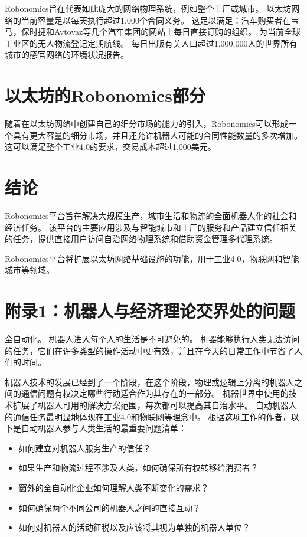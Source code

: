 \documentclass[UTF8]{article}
\begin{document}
Robonomics旨在代表如此庞大的网络物理系统，例如整个工厂或城市。 以太坊网络的当前容量足以每天执行超过1,000个合同义务。 这足以满足：汽车购买者在宝马，保时捷和Avtovaz等几个汽车集团的网站上每日直接订购的组织。 为当前全球工业区的无人物流登记定期航线。 每日出版有关人口超过1,000,000人的世界所有城市的感官网络的环境状况报告。

\section{以太坊的Robonomics部分}

随着在以太坊网络中创建自己的细分市场的能力的引入，Robonomics可以形成一个具有更大容量的细分市场，并且还允许机器人可能的合同性能数量的多次增加。 这可以满足整个工业4.0的要求，交易成本超过1,000美元。

\section{结论}

Robonomics平台旨在解决大规模生产，城市生活和物流的全面机器人化的社会和经济任务。 该平台的主要应用涉及与智能城市和工厂的服务和产品建立信任相关的任务，提供直接用户访问自治网络物理系统和借助资金管理多代理系统。

Robonomics平台将扩展以太坊网络基础设施的功能，用于工业4.0，物联网和智能城市等领域。
\newpage
\printbibliography
\newpage
\section*{附录1：机器人与经济理论交界处的问题}

全自动化。 机器人进入每个人的生活是不可避免的。 机器能够执行人类无法访问的任务，它们在许多类型的操作活动中更有效，并且在今天的日常工作中节省了人们的时间。

机器人技术的发展已经到了一个阶段，在这个阶段，物理或逻辑上分离的机器人之间的通信问题有权决定哪些行动适合作为其存在的一部分。 机器世界中使用的技术扩展了机器人可用的解决方案范围，每次都可以提高其自治水平。
自动机器人的通信任务最明显地体现在工业4.0和物联网等理念中。 根据这项工作的作者，以下是自动机器人参与人类生活的最重要问题清单：

\begin{itemize}
	\item 如何建立对机器人服务生产的信任？
	\item 如果生产和物流过程不涉及人类，如何确保所有权转移给消费者？
	\item 窗外的全自动化企业如何理解人类不断变化的需求？
	\item 如何确保两个不同公司的机器人之间的直接互动？
	\item 如何对机器人的活动征税以及应该将其视为单独的机器人单位？
\end{itemize}
\end{document}
